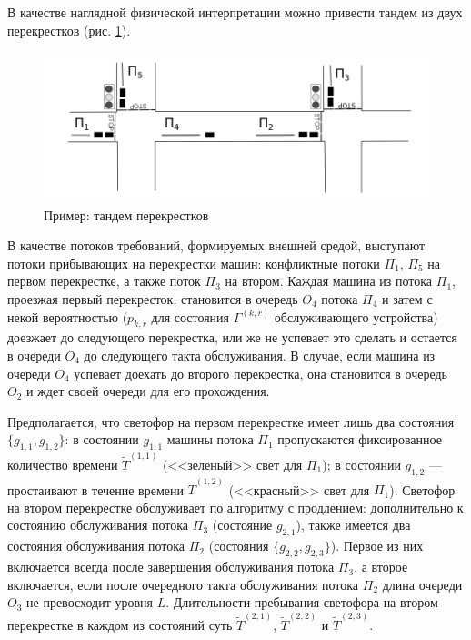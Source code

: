 \documentclass{report}
\begin{document}
В качестве наглядной физической интерпретации можно привести тандем из двух перекрестков (рис. \ref{crossroads}).
\begin{figure}[h]
\includegraphics[scale=0.5]{Crossroads_grayscale.png} 
\caption{Пример: тандем перекрестков}
\label{crossroads}
\end{figure}
В качестве потоков требований, формируемых внешней средой, выступают потоки прибывающих на перекрестки машин: конфликтные потоки $\Pi_1$, $\Pi_5$ на первом перекрестке, а также поток $\Pi_3$ на втором. Каждая машина из потока $\Pi_1$, проезжая первый перекресток, становится в очередь $O_4$ потока $\Pi_4$ и затем с некой вероятностью ($p_{k,r}$ для состояния $\Gamma^{(k,r)}$ обслуживающего устройства) доезжает до следующего перекрестка, или же не успевает это сделать и остается в очереди $O_4$ до следующего такта обслуживания. В случае, если машина из очереди $O_4$ успевает доехать до второго перекрестка, она становится в очередь $O_2$ и ждет своей очереди для его прохождения.

Предполагается, что светофор на первом перекрестке имеет лишь два состояния $\{g_{1,1},g_{1,2}\}$: в состоянии $g_{1,1}$ машины потока $\Pi_1$ пропускаются фиксированное количество времени $\widetilde T^{(1,1)}$ (<<зеленый>> свет для $\Pi_1$); в состоянии $g_{1,2}$ --- простаивают в течение времени $\widetilde T^{(1,2)}$ (<<красный>> свет для $\Pi_1$). Светофор на втором перекрестке обслуживает по алгоритму с продлением: дополнительно к состоянию обслуживания потока $\Pi_3$ (состояние $g_{2,1}$), также имеется два состояния обслуживания потока $\Pi_2$ (состояния $\{g_{2,2},g_{2,3}\}$). Первое из них включается всегда после завершения обслуживания потока $\Pi_3$, а второе включается, если после очередного такта обслуживания потока $\Pi_2$ длина очереди $O_3$ не превосходит уровня $L$.
Длительности пребывания светофора на втором перекрестке в каждом из состояний суть $\widetilde T^{(2,1)}$, $\widetilde T^{(2,2)}$ и $\widetilde T^{(2,3)}$.
\end{document}
